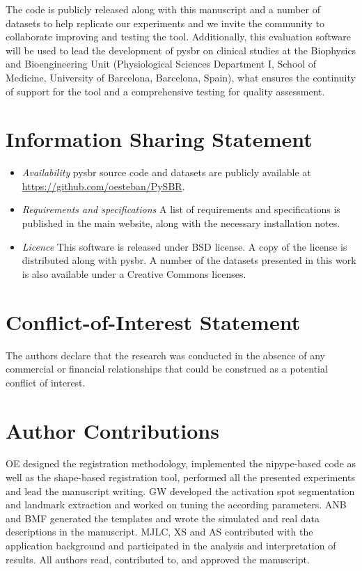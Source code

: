 \documentclass{frontiers}
\newcommand{\emitem}[1]{\item \emph{#1}}
\begin{document}
The code is publicly released along with this manuscript and
  a number of datasets to help replicate our experiments and we
  invite the community to collaborate improving and testing
  the tool.
\cbstart
Additionally, this evaluation software will be used to lead the
  development of \gls*{pysbr} on clinical studies at the Biophysics 
  and Bioengineering Unit (Physiological 
  Sciences Department I, School of Medicine, University of 
  Barcelona, Barcelona, Spain), what ensures the
  continuity of support for the tool and a comprehensive
  testing for quality assessment.
\cbend

\section*{Information Sharing Statement}
\label{sec:iss}

\begin{itemize}
\emitem{Availability} \gls*{pysbr} source code and datasets are
  publicly available at \url{https://github.com/oesteban/PySBR}.

\emitem{Requirements and specifications} A list of requirements and
  specifications is published in the main website, along with
  the necessary installation notes.

\emitem{Licence} This software is released under BSD license.
  A copy of the license is distributed along with \gls*{pysbr}.
  A number of the datasets presented in this work is also
  available under a Creative Commons licenses.
\end{itemize}

\section*{Conflict-of-Interest Statement}
The authors declare that the research was conducted in the absence of any commercial or financial relationships 
that could be construed as a potential conflict of interest.

\section*{Author Contributions}
OE designed the registration methodology, implemented the \gls*{nipype}-based code
  as well as the shape-based registration tool, performed all the presented experiments
  and lead the manuscript writing.
GW developed the activation spot segmentation and landmark extraction
  and worked on tuning the according parameters.
ANB and BMF generated the templates and wrote the simulated and real data
  descriptions in the manuscript.
MJLC, XS and AS contributed with the application background and participated
  in the analysis and interpretation of results.
All authors read, contributed to, and approved the manuscript.
\end{document}
